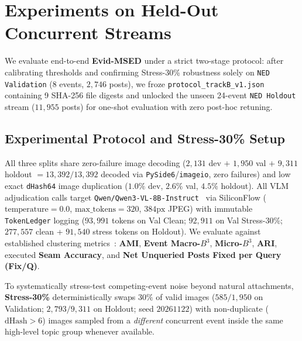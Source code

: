 \section{Experiments on Held-Out Concurrent Streams}
\label{sec:experiments}

We evaluate end-to-end \textbf{Evid-MSED} under a strict two-stage protocol: after calibrating thresholds and confirming Stress-30\% robustness solely on \texttt{NED Validation} ($8$ events, $2{,}746$ posts), we froze \texttt{protocol\_trackB\_v1.json} containing 9 SHA-256 file digests and unlocked the unseen 24-event \texttt{NED Holdout} stream ($11{,}955$ posts) for one-shot evaluation with zero post-hoc retuning.

\subsection{Experimental Protocol and Stress-30\% Setup}
\label{sec:exp_setup}

All three splits share zero-failure image decoding ($2{,}131$ dev $+$ $1{,}950$ val $+$ $9{,}311$ holdout $= 13{,}392/13{,}392$ decoded via \texttt{PySide6}/\texttt{imageio}, zero failures) and low exact \texttt{dHash64} image duplication ($1.0\%$ dev, $2.6\%$ val, $4.5\%$ holdout). All VLM adjudication calls target \texttt{Qwen/Qwen3-VL-8B-Instruct}~\cite{bai2025qwen3vl} via SiliconFlow ($\text{temperature}=0.0$, $\text{max\_tokens}=320$, $384\text{px}$ JPEG) with immutable \texttt{TokenLedger} logging ($93{,}991$ tokens on Val Clean; $92{,}911$ on Val Stress-30\%; $277{,}557$ clean + $91{,}540$ stress tokens on Holdout). We evaluate against established clustering metrics~\cite{amigo2009comparison,vinh2010information}: \textbf{AMI}, \textbf{Event Macro-$B^3$}, \textbf{Micro-$B^3$}, \textbf{ARI}, executed \textbf{Seam Accuracy}, and \textbf{Net Unqueried Posts Fixed per Query (Fix/Q)}.

To systematically stress-test competing-event noise beyond natural attachments, \textbf{Stress-30\%} deterministically swaps $30\%$ of valid images ($585/1{,}950$ on Validation; $2{,}793/9{,}311$ on Holdout; seed $20261122$) with non-duplicate ($\mathrm{dHash} > 6$) images sampled from a \emph{different} concurrent event inside the same high-level topic group whenever available.

